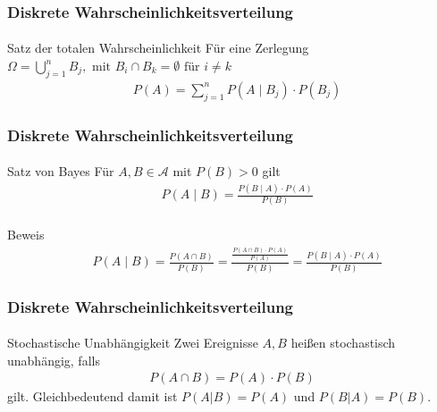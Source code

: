 \documentclass{beamer}
\begin{document}
\begin{frame}
    \frametitle{Diskrete Wahrscheinlichkeitsverteilung}
\framesubtitle{}

\begin{block}{Satz der totalen Wahrscheinlichkeit}
Für eine Zerlegung  $\Omega = \bigcup_{j=1}^{n} B_j, \text{ mit } B_i \cap B_k = \emptyset \text{ für } i \neq k $
\begin{align*}
& P(A ) = \sum_{j=1}^{n}  P(A \; | \;  B_j) \cdot P(B_j)
\end{align*}
\end{block}

 \end{frame}



\begin{frame}
    \frametitle{Diskrete Wahrscheinlichkeitsverteilung}
\framesubtitle{}

\begin{block}{Satz von Bayes}
Für $A,B \in \mathcal{A}$ mit  $P(B) > 0$ gilt
\begin{align*}
& P(A \; | \;  B) = \frac{P(B \; | \; A) \cdot P(A)} {P(B)} \\
\end{align*}
\end{block}

\begin{block}{Beweis}
\begin{align*}
& P(A \; | \;  B) =\frac{P(A \cap B)}{P(B)} = \frac{ \frac{P(A \cap B) \cdot P(A)}{P(A)}}{P(B)}  =  \frac{P(B \; | \; A) \cdot P(A)} {P(B)} 
\end{align*}
\end{block}



 \end{frame}



\begin{frame}
    \frametitle{Diskrete Wahrscheinlichkeitsverteilung}
\framesubtitle{}

\begin{block}{Stochastische Unabhängigkeit}
Zwei Ereignisse $A,B$ heißen stochastisch unabhängig, falls
\begin{align*}
P(A \cap B) = P(A) \cdot P(B)
\end{align*}
gilt.  Gleichbedeutend damit ist  $P(A | B) = P(A)$ und $P(B  | A) = P(B)$.
\end{block}



 \end{frame}
\end{document}
